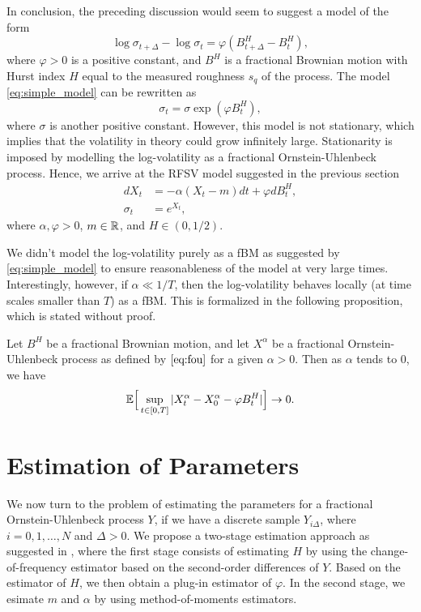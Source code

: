 In conclusion, the preceding discussion would seem to suggest a model of the form
\begin{equation}\label{eq:simple_model}
    \log \sigma_{t+\Delta} - \log \sigma_{t} = \varphi(B^{H}_{t+\Delta}-B^{H}_{t}),
\end{equation}
where $\varphi >0$ is a positive constant, and $B^{H}$ is a fractional Brownian motion with Hurst index $H$ equal to the measured roughness $s_{q}$ of the process. The model \eqref{eq:simple_model} can be rewritten as 
\begin{equation}
    \sigma_{t}=\sigma \exp\left(\varphi B_{t}^{H}\right),
\end{equation}
where $\sigma$ is another positive constant. However, this model is not stationary, which implies that the volatility in theory could grow infinitely large. Stationarity is imposed by modelling the log-volatility as a fractional Ornstein-Uhlenbeck process. Hence, we arrive at the RFSV model suggested in the previous section
\begin{align}
    dX_{t}&= -\alpha(X_{t}-m)dt + \varphi dB^{H}_{t},\label{eq:fou}\\
    \sigma_{t} &= e^{X_{t}},
\end{align}
where $\alpha,\varphi>0$, $m\in \mathbb{R}$, and $H\in (0,1/2)$.

We didn't model the log-volatility purely as a fBM as suggested by \eqref{eq:simple_model} to ensure reasonableness of the model at very large times. Interestingly, however, if $\alpha \ll 1/T$, then the log-volatility behaves locally (at time scales smaller than $T$) as a fBM. This is formalized in the following proposition, which is stated without proof.
\begin{prop}\label{prop:fOU}
Let $B^{H}$ be a fractional Brownian motion, and let $X^{\alpha}$ be a fractional Ornstein-Uhlenbeck process as defined by $\eqref{eq:fou}$ for a given $\alpha>0$. Then as $\alpha$ tends to $0$, we have
\begin{equation}
    \mathbb{E}\Bigr[ \sup_{t\in [0,T]}|X_{t}^{\alpha}-X_{0}^{\alpha}-\varphi B^{H}_{t}|\Bigr]\to 0.
\end{equation}
\end{prop}
\section{Estimation of Parameters}
We now turn to the problem of estimating the parameters for a fractional Ornstein-Uhlenbeck process $Y$, if we have a discrete sample $Y_{i\Delta}$, where $i=0,1,\dots,N$ and $\Delta>0$. We propose a two-stage estimation approach as suggested in \cite{estimationfOU}, where the first stage consists of estimating $H$ by using the change-of-frequency estimator based on the second-order differences of $Y$. Based on the estimator of $H$, we then obtain a plug-in estimator of $\varphi$. In the second stage, we esimate $m$ and $\alpha$ by using method-of-moments estimators. 


